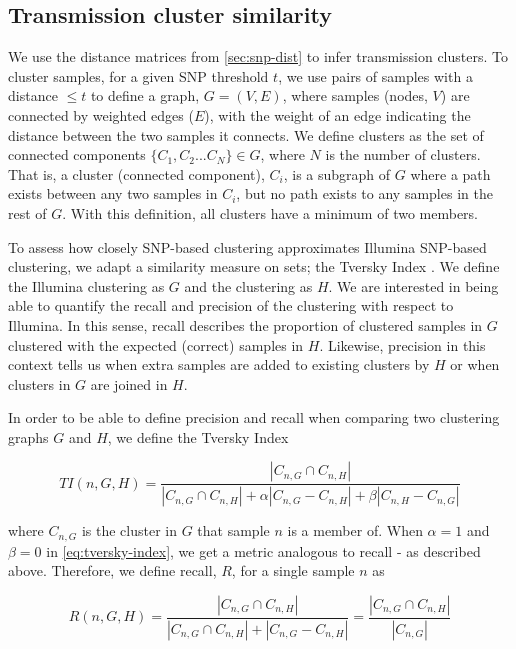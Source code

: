 \subsection{Transmission cluster similarity}
\label{sec:cluster-similarity}

We use the distance matrices from \autoref{sec:snp-dist} to infer transmission clusters. To cluster samples, for a given SNP threshold $t$, we use pairs of samples with a distance $\le t$ to define a graph, $G=(V,E)$, where samples (nodes, $V$) are connected by weighted edges ($E$), with the weight of an edge indicating the distance between the two samples it connects. We define clusters as the set of connected components $\{C_1, C_2...C_N\}\in G$, where $N$ is the number of clusters. That is, a cluster (connected component), $C_i$, is a subgraph of $G$ where a path exists between any two samples in $C_i$, but no path exists to any samples in the rest of $G$. With this definition, all clusters have a minimum of two members. 

To assess how closely \ont{} SNP-based clustering approximates Illumina SNP-based clustering, we adapt a similarity measure on sets; the Tversky Index \cite{tversky1977}. We define the Illumina clustering as $G$ and the \ont{} clustering as $H$. We are interested in being able to quantify the recall and precision of the \ont{} clustering with respect to Illumina. In this sense, recall describes the proportion of clustered samples in $G$ clustered with the expected (correct) samples in $H$. Likewise, precision in this context tells us when extra samples are added to existing clusters by $H$ or when clusters in $G$ are joined in $H$. 

In order to be able to define precision and recall when comparing two clustering graphs $G$ and $H$, we define the Tversky Index

\begin{equation}
\label{eq:tversky-index}
   TI(n, G, H)=\frac{\left|C_{n,G}\cap C_{n,H}\right|}{\left|C_{n,G}\cap C_{n,H}\right|+\alpha |C_{n,G}-C_{n,H}|+\beta |C_{n,H}-C_{n,G}|}
\end{equation}

where $C_{n,G}$ is the cluster in $G$ that sample $n$ is a member of. When $\alpha = 1$ and $\beta=0$ in \autoref{eq:tversky-index}, we get a metric analogous to recall - as described above. Therefore, we define recall, $R$, for a single sample $n$ as

\begin{equation}
\label{eq:recall}
   R(n, G, H)=\frac{\left|C_{n,G}\cap C_{n,H}\right|}{\left|C_{n,G}\cap C_{n,H}\right|+|C_{n,G}-C_{n,H}|}=\frac{\left|C_{n,G}\cap C_{n,H}\right|}{|C_{n,G}|}
\end{equation}

